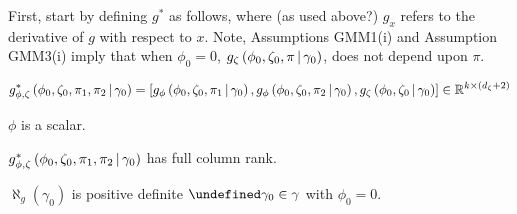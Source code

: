 \documentclass[11pt]{article}
\newcommand*{\R}{\mathbb{R}}
\let\oldforall\forall
\let\forall\undefined
\DeclareMathOperator{\forall}{\oldforall}
\newcommand{\mvert}[1][\middle]{\ensuremath{\,#1\vert\,}}
\begin{document}
First, start by defining $g^{*}$ as follows, where (as used above?) $g_{x}$ refers to the derivative of $g$ with
respect to $x$.
Note, Assumptions GMM1(i) and Assumption GMM3(i) imply that when $\phi_0 = 0$, $g_{\zeta}\left(\phi_0, \zeta_0,
\pi \mvert \gamma_0\right)$, does not depend upon $\pi$.

\begin{equation}
    g_{\phi, \zeta}^{*}\left(\phi_0, \zeta_0, \pi_1, \pi_2 \mvert \gamma_0\right)  =
    \left[g_{\phi}\left(\phi_0, \zeta_0, \pi_1 \mvert \gamma_0\right)  , g_{\phi}\left(\phi_0, \zeta_0, \pi_2
    \mvert \gamma_0\right) , g_{\zeta} \left(\phi_0, \zeta_0 \mvert \gamma_0\right)  \right]  \in \R^{k \times
    (d_{\zeta} + 2)}
\end{equation}

\begin{assump}[GMM 4]\label{ass:GMM4}
\begin{assumplist}
    \item $\phi$ is a scalar.
    \item $g_{\phi, \zeta}^{*}\left(\phi_0, \zeta_0, \pi_1, \pi_2 \mvert \gamma_0\right)$ has full column rank. 
    \item $\aleph_g(\gamma_0)$ is positive definite $\forall \gamma_0 \in \gamma $ with $\phi_0 = 0$. 
\end{assumplist}
\end{assump}





\printbibliography
\end{document}
